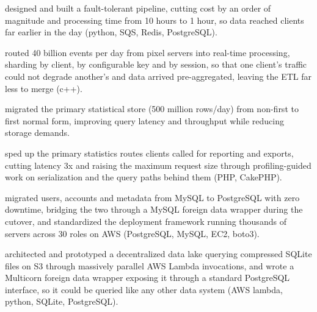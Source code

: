 \begin{bullets}
    \item {}designed and built a fault-tolerant pipeline, cutting cost by an order of magnitude and processing time from {\mytilde}10 hours to {\mytilde}1 hour, so data reached clients far earlier in the day (python, SQS, Redis, PostgreSQL).
    \item {}routed {\mytilde}40 billion events per day from pixel servers into real-time processing, sharding by client, by configurable key and by session, so that one client's traffic could not degrade another's and data arrived pre-aggregated, leaving the ETL far less to merge (c++).
    \item {}migrated the primary statistical store (500 million rows/day) from non-first to first normal form, improving query latency and throughput while reducing storage demands.
    \item {}sped up the primary statistics routes clients called for reporting and exports, cutting latency {\mytilde}3x and raising the maximum request size through profiling-guided work on serialization and the query paths behind them (PHP, CakePHP).
    \item {}migrated users, accounts and metadata from MySQL to PostgreSQL with zero downtime, bridging the two through a MySQL foreign data wrapper during the cutover, and standardized the deployment framework running thousands of servers across {\mytilde}30 roles on AWS (PostgreSQL, MySQL, EC2, boto3).
    \item {}architected and prototyped a decentralized data lake querying compressed SQLite files on S3 through massively parallel AWS Lambda invocations, and wrote a Multicorn foreign data wrapper exposing it through a standard PostgreSQL interface, so it could be queried like any other data system (AWS lambda, python, SQLite, PostgreSQL).
\end{bullets}
